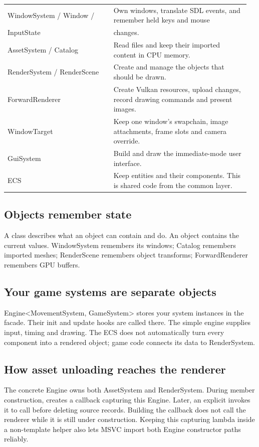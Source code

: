 \documentclass[11pt,a4paper]{article}
\begin{document}
{\small
\begin{longtable}{@{}p{0.42\linewidth}p{0.54\linewidth}@{}}
WindowSystem / Window / & Own windows, translate SDL events, and remember held keys and mouse \\
InputState & changes. \\
AssetSystem / Catalog & Read files and keep their imported content in CPU memory. \\
RenderSystem / RenderScene & Create and manage the objects that should be drawn. \\
ForwardRenderer & Create Vulkan resources, upload changes, record drawing commands and present images. \\
WindowTarget & Keep one window's swapchain, image attachments, frame slots and camera override. \\
GuiSystem & Build and draw the immediate-mode user interface. \\
ECS & Keep entities and their components. This is shared code from the common layer. \\
\end{longtable}
}

\subsection*{Objects remember state}
A class describes what an object can contain and do. An object contains the current values. WindowSystem remembers its windows; Catalog remembers imported meshes; RenderScene remembers object transforms; ForwardRenderer remembers GPU buffers.

\subsection*{Your game systems are separate objects}
Engine<MovementSystem, GameSystem> stores your system instances in the facade. Their init and update hooks are called there. The simple engine supplies input, timing and drawing. The ECS does not automatically turn every component into a rendered object; game code connects its data to RenderSystem.
\subsection*{How asset unloading reaches the renderer}
The concrete Engine owns both AssetSystem and RenderSystem. During member construction,  creates a callback capturing this Engine. Later, an explicit  invokes it to call  before deleting source records. Building the callback does not call the renderer while it is still under construction. Keeping this capturing lambda inside a non-template helper also lets MSVC import both Engine constructor paths reliably.
\end{document}
